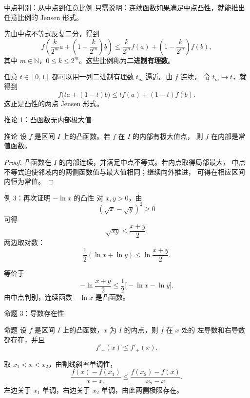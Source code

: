 \documentclass[aspectratio=169,11pt]{ctexbeamer}
\begin{document}
\begin{frame}{中点判别：从中点到任意比例}
\small
只需说明：连续函数如果满足中点凸性，就能推出任意比例的 Jensen 形式。

先由中点不等式反复二分，得到
\[
  f\!\left(\frac{k}{2^m}a+\left(1-\frac{k}{2^m}\right)b\right)
  \le
  \frac{k}{2^m}f(a)+\left(1-\frac{k}{2^m}\right)f(b),
\]
其中 $m\in\mathbb N$，$0\le k\le 2^m$。这些比例称为\textbf{二进制有理数}。

任意 $t\in[0,1]$ 都可以用一列二进制有理数 $t_m$ 逼近。由 $f$ 连续，
令 $t_m\to t$，就得到
\[
  f\bigl(ta+(1-t)b\bigr)
  \le t f(a)+(1-t)f(b).
\]
这正是凸性的两点 Jensen 形式。
\end{frame}

\begin{frame}{推论 1：凸函数无内部极大值}
\small
\begin{block}{推论}
设 $f$ 是区间 $I$ 上的凸函数。若 $f$ 在 $I$ 的内部有极大值点，
则 $f$ 在内部是常值函数。
\end{block}

\begin{proof}
凸函数在 $I$ 的内部连续，并满足中点不等式。若内点取得局部最大，
中点不等式迫使邻域内的两侧函数值与最大值相同；继续向外推进，
可得在相应区间内恒为常值。
\end{proof}
\end{frame}

\begin{frame}{例 3：再次证明 $-\ln x$ 的凸性}
\small
对 $x,y>0$，由
\[
  (\sqrt{x}-\sqrt{y})^2\ge0
\]
可得
\[
  \sqrt{xy}\le \frac{x+y}{2}.
\]
两边取对数：
\[
  \frac12(\ln x+\ln y)
  \le
  \ln\frac{x+y}{2}.
\]

等价于
\[
  -\ln\frac{x+y}{2}
  \le
  \frac12\bigl[-\ln x-\ln y\bigr].
\]
由中点判别，连续函数 $-\ln x$ 是凸函数。
\end{frame}

\begin{frame}{命题 3：导数存在性}
\small
\begin{block}{命题}
设 $f$ 是区间 $I$ 上的凸函数，$x$ 为 $I$ 的内点，则 $f$ 在 $x$ 处的
左导数和右导数都存在，并且
\[
  f'_-(x)\le f'_+(x).
\]
\end{block}

取 $x_1<x<x_2$，由割线斜率单调性，
\[
  \frac{f(x)-f(x_1)}{x-x_1}
  \le
  \frac{f(x_2)-f(x)}{x_2-x}.
\]
左边关于 $x_1$ 单调，右边关于 $x_2$ 单调，由此两侧极限存在。
\end{frame}
\end{document}

